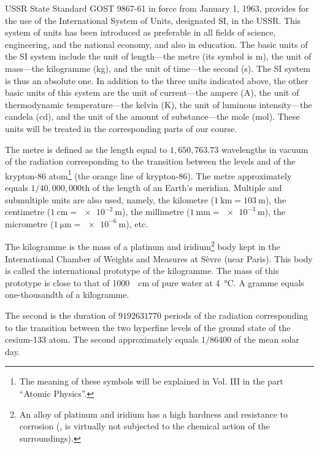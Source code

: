 USSR State Standard GOST 9867-61 in force from January 1, 1963, provides for the use of the International System of Units, designated SI, in the USSR. This system of units has been introduced as preferable in all fields of science, engineering, and the national economy, and also in education. The basic units of the SI system include the unit of length---the metre (its symbol is \si{\metre}), the unit of mass---the kilogramme (\si{\kilo\gram}), and the unit of time---the second (\si{\second}). The SI system is thus an absolute one. In addition to the three units indicated above, the other basic units of this system are the unit of current---the ampere (\si{\ampere}), the unit of thermodynamic temperature---the kelvin (\si{\kelvin}), the unit of luminous intensity---the candela (\si{\candela}), and the unit of the amount of substance---the mole (\si{\mole}). These units will be treated in the corresponding parts of our course.

The metre is defined as the length equal to $1,650,763.73$ wavelengths in vacuum of the radiation corresponding to the transition between the levels  and  of the krypton-86 atom\footnote{The meaning of these symbols will be explained in Vol. III in the part ``Atomic Physics''.} (the orange line of krypton-86). The metre approximately equals $1/40,000,000$th of the length of an Earth's meridian. Multiple and submultiple units are also used, namely, the kilometre ($\SI{1}{\kilo\metre}=\SI{103}{\metre}$), the centimetre ($\SI{1}{\centi\metre}=\SI{e-2}{\metre}$), the millimetre ($\SI{1}{\milli\metre}=\SI{e-3}{\metre}$), the micrometre ($\SI{1}{\micro\metre}=\SI{e-6}{\metre}$), etc.

The kilogramme is the mass of a platinum and iridium\footnote{An alloy of platinum and iridium has a high hardness and resistance to corrosion (\ie, is virtually not subjected to the chemical action of the surroundings).} body kept in the International Chamber of Weights and Measures at S\`evre (near Paris). This body is called the international prototype of the kilogramme. The mass of this prototype is close to that of \SI{1000}{\cubed\centi\metre} of pure water at \SI{4}{\degreeCelsius}. A gramme equals one-thousandth of a kilogramme.

The second is the duration of $9192631770$ periods of the radiation corresponding to the transition between the two hyperfine levels of the ground state of the cesium-133 atom. The second approximately equals $1/86400$ of the mean solar day.

